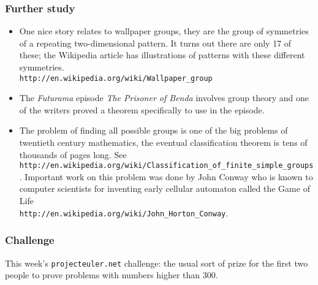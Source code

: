 \documentclass[12pt]{article}
\begin{document}
\subsubsection*{Further study}
\begin{itemize}
\item One nice story relates to wallpaper groups, they are the group of symmetries of a repeating two-dimensional pattern. It turns out there are only 17 of these; the Wikipedia article has illustrations of patterns with these different symmetries.\\ \texttt{http://en.wikipedia.org/wiki/Wallpaper\_group}
\item The \textsl{Futurama} episode \textsl{The Prisoner of Benda}
  involves group theory and one of the writers proved a theorem
  specifically to use in the episode.
\item The problem of finding all possible groups is one of the big problems of twentieth century mathematics, the eventual classification theorem is tens of thousands of pages long. See \texttt{http://en.wikipedia.org/wiki/Classification\_of\_finite\_simple\_groups}. Important work on this problem was done by John Conway who is known to computer scientists for inventing early cellular automaton called the Game of Life\\ \texttt{http://en.wikipedia.org/wiki/John\_Horton\_Conway}.
\end{itemize}

\subsubsection*{Challenge}
This week's \texttt{projecteuler.net} challenge: the usual sort of prize for the first two people to prove problems with numbers higher than 300.
\end{document}

